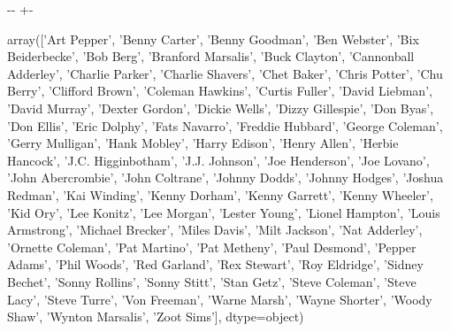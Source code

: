\documentclass[letterpaper,10pt,english]{sphinxmanual}
\newlength\nbsphinxcodecellspacing
\begin{document}
{

\kern-\sphinxverbatimsmallskipamount\kern-\baselineskip
\kern+\FrameHeightAdjust\kern-\fboxrule
\vspace{\nbsphinxcodecellspacing}

\begin{sphinxVerbatim}[commandchars=\\\{\}]
\llap{\color{nbsphinxout}[62]:\,\hspace{\fboxrule}\hspace{\fboxsep}}array(['Art Pepper', 'Benny Carter', 'Benny Goodman', 'Ben Webster',
       'Bix Beiderbecke', 'Bob Berg', 'Branford Marsalis', 'Buck Clayton',
       'Cannonball Adderley', 'Charlie Parker', 'Charlie Shavers',
       'Chet Baker', 'Chris Potter', 'Chu Berry', 'Clifford Brown',
       'Coleman Hawkins', 'Curtis Fuller', 'David Liebman',
       'David Murray', 'Dexter Gordon', 'Dickie Wells', 'Dizzy Gillespie',
       'Don Byas', 'Don Ellis', 'Eric Dolphy', 'Fats Navarro',
       'Freddie Hubbard', 'George Coleman', 'Gerry Mulligan',
       'Hank Mobley', 'Harry Edison', 'Henry Allen', 'Herbie Hancock',
       'J.C. Higginbotham', 'J.J. Johnson', 'Joe Henderson', 'Joe Lovano',
       'John Abercrombie', 'John Coltrane', 'Johnny Dodds',
       'Johnny Hodges', 'Joshua Redman', 'Kai Winding', 'Kenny Dorham',
       'Kenny Garrett', 'Kenny Wheeler', 'Kid Ory', 'Lee Konitz',
       'Lee Morgan', 'Lester Young', 'Lionel Hampton', 'Louis Armstrong',
       'Michael Brecker', 'Miles Davis', 'Milt Jackson', 'Nat Adderley',
       'Ornette Coleman', 'Pat Martino', 'Pat Metheny', 'Paul Desmond',
       'Pepper Adams', 'Phil Woods', 'Red Garland', 'Rex Stewart',
       'Roy Eldridge', 'Sidney Bechet', 'Sonny Rollins', 'Sonny Stitt',
       'Stan Getz', 'Steve Coleman', 'Steve Lacy', 'Steve Turre',
       'Von Freeman', 'Warne Marsh', 'Wayne Shorter', 'Woody Shaw',
       'Wynton Marsalis', 'Zoot Sims'], dtype=object)
\end{sphinxVerbatim}
}
\end{document}
